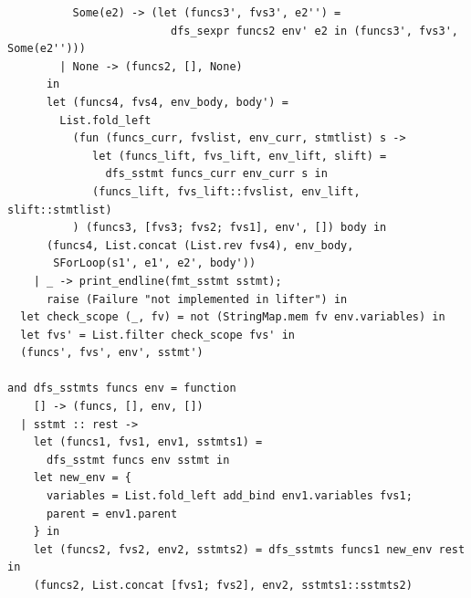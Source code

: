 \documentclass[12pt]{article}
\begin{document}
\begin{mdframed}[hidealllines=true,backgroundcolor=blue!20]
\begin{lstlisting}
          Some(e2) -> (let (funcs3', fvs3', e2'') = 
                         dfs_sexpr funcs2 env' e2 in (funcs3', fvs3', Some(e2'')))
        | None -> (funcs2, [], None)
      in
      let (funcs4, fvs4, env_body, body') = 
        List.fold_left 
          (fun (funcs_curr, fvslist, env_curr, stmtlist) s ->
             let (funcs_lift, fvs_lift, env_lift, slift) =
               dfs_sstmt funcs_curr env_curr s in 
             (funcs_lift, fvs_lift::fvslist, env_lift, slift::stmtlist)
          ) (funcs3, [fvs3; fvs2; fvs1], env', []) body in
      (funcs4, List.concat (List.rev fvs4), env_body, 
       SForLoop(s1', e1', e2', body'))   
    | _ -> print_endline(fmt_sstmt sstmt); 
      raise (Failure "not implemented in lifter") in
  let check_scope (_, fv) = not (StringMap.mem fv env.variables) in
  let fvs' = List.filter check_scope fvs' in
  (funcs', fvs', env', sstmt')

and dfs_sstmts funcs env = function
    [] -> (funcs, [], env, [])
  | sstmt :: rest ->
    let (funcs1, fvs1, env1, sstmts1) = 
      dfs_sstmt funcs env sstmt in
    let new_env = {
      variables = List.fold_left add_bind env1.variables fvs1;
      parent = env1.parent
    } in
    let (funcs2, fvs2, env2, sstmts2) = dfs_sstmts funcs1 new_env rest in
    (funcs2, List.concat [fvs1; fvs2], env2, sstmts1::sstmts2)


\end{lstlisting}
\end{mdframed}
\end{document}
